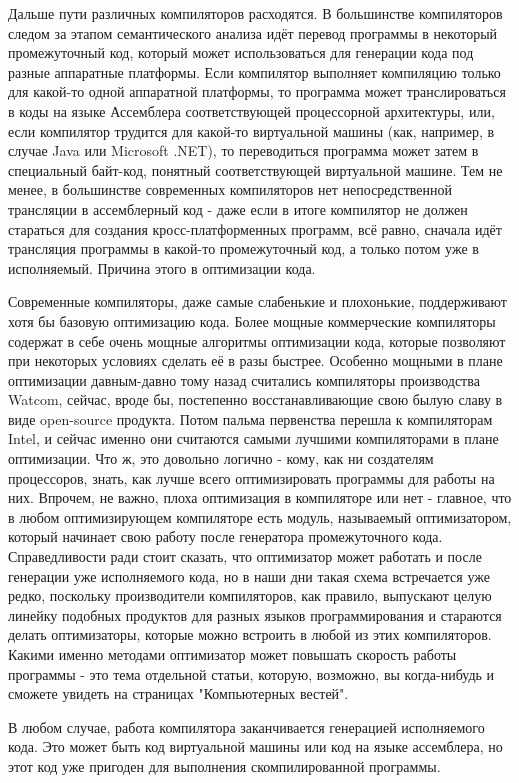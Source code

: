 \documentclass{article}
\begin{document}
Дальше пути различных компиляторов расходятся. В большинстве компиляторов следом за этапом семантического анализа идёт перевод программы в некоторый промежуточный код, который может использоваться для генерации кода под разные аппаратные платформы. Если компилятор выполняет компиляцию только для какой-то одной аппаратной платформы, то программа может транслироваться в коды на языке Ассемблера соответствующей процессорной архитектуры, или, если компилятор трудится для какой-то виртуальной машины (как, например, в случае Java или Microsoft .NET), то переводиться программа может затем в специальный байт-код, понятный соответствующей виртуальной машине. Тем не менее, в большинстве современных компиляторов нет непосредственной трансляции в ассемблерный код - даже если в итоге компилятор не должен стараться для создания кросс-платформенных программ, всё равно, сначала идёт трансляция программы в какой-то промежуточный код, а только потом уже в исполняемый. Причина этого в оптимизации кода.

Современные компиляторы, даже самые слабенькие и плохонькие, поддерживают хотя бы базовую оптимизацию кода. Более мощные коммерческие компиляторы содержат в себе очень мощные алгоритмы оптимизации кода, которые позволяют при некоторых условиях сделать её в разы быстрее. Особенно мощными в плане оптимизации давным-давно тому назад считались компиляторы производства Watcom, сейчас, вроде бы, постепенно восстанавливающие свою былую славу в виде open-source продукта. Потом пальма первенства перешла к компиляторам Intel, и сейчас именно они считаются самыми лучшими компиляторами в плане оптимизации. Что ж, это довольно логично - кому, как ни создателям процессоров, знать, как лучше всего оптимизировать программы для работы на них. Впрочем, не важно, плоха оптимизация в компиляторе или нет - главное, что в любом оптимизирующем компиляторе есть модуль, называемый оптимизатором, который начинает свою работу после генератора промежуточного кода. Справедливости ради стоит сказать, что оптимизатор может работать и после генерации уже исполняемого кода, но в наши дни такая схема встречается уже редко, поскольку производители компиляторов, как правило, выпускают целую линейку подобных продуктов для разных языков программирования и стараются делать оптимизаторы, которые можно встроить в любой из этих компиляторов. Какими именно методами оптимизатор может повышать скорость работы программы - это тема отдельной статьи, которую, возможно, вы когда-нибудь и сможете увидеть на страницах "Компьютерных вестей".

В любом случае, работа компилятора заканчивается генерацией исполняемого кода. Это может быть код виртуальной машины или код на языке ассемблера, но этот код уже пригоден для выполнения скомпилированной программы.
\end{document}

